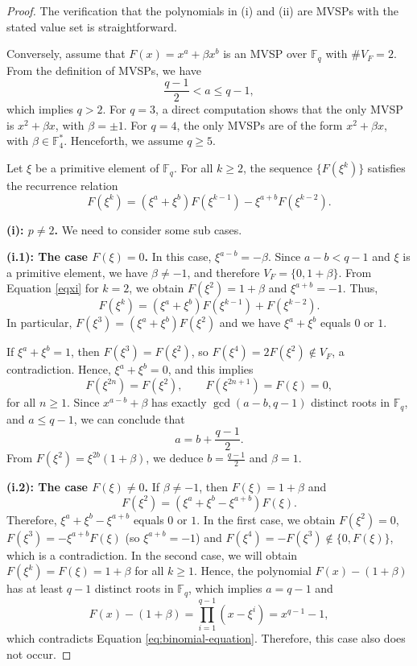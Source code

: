\documentclass[preprint,12pt]{elsarticle}
\begin{document}
\begin{proof}
The verification that the polynomials in {\rm (i)} and {\rm (ii)} are MVSPs with the stated value set is straightforward.

Conversely, assume that $F(x) = x^a + \beta x^b$ is an MVSP over $\mathbb{F}_q$ with $\#V_F = 2$. From the definition of MVSPs, we have
\[
\frac{q-1}{2} < a \leq q-1,
\]
which implies $q > 2$. For $q = 3$, a direct computation shows that the only MVSP is $x^2 + \beta x$, with $\beta = \pm 1$.
For $q = 4$, the only MVSPs are of the form $x^2 + \beta x$, with $\beta \in \mathbb{F}_4^*$. Henceforth, we assume $q \ge 5$.

Let $\xi$ be a primitive element of $\mathbb{F}_q$. For all $k \ge 2$, the sequence $\{F(\xi^k)\}$ satisfies the recurrence relation
\begin{equation}\label{eqxi}
F(\xi^k) = (\xi^a + \xi^b)F(\xi^{k-1}) - \xi^{a+b}F(\xi^{k-2}).
\end{equation}

\medskip

\noindent
\textbf{(i): $p \neq 2$.} We need to consider some sub cases.

\noindent
\textbf{(i.1): The case $F(\xi) = 0$.}
In this case, $\xi^{a-b} = -\beta$. Since $a-b < q-1$ and $\xi$ is a primitive element, we have $\beta \neq -1$, and therefore $V_F = \{0, 1+\beta\}$. From Equation \eqref{eqxi} for $k=2$, we obtain $F(\xi^2)=1+\beta$ and $\xi^{a+b}=-1$. Thus,
\[
F(\xi^k) = (\xi^a+\xi^b)F(\xi^{k-1}) + F(\xi^{k-2}).
\]
In particular, $F(\xi^3) = (\xi^a + \xi^b)F(\xi^2)$ and we have $\xi^a + \xi^b$ equals $0$ or $1$.

If $\xi^a+\xi^b = 1$, then $F(\xi^3) = F(\xi^2)$, so $F(\xi^4)=2F(\xi^2)\notin V_F$, a contradiction. Hence, $\xi^a+\xi^b=0$, and this implies
\[
F(\xi^{2n}) = F(\xi^2), \qquad F(\xi^{2n+1}) = F(\xi) = 0,
\]
for all $n \ge 1$. Since \( x^{a - b} + \beta \) has exactly \( \gcd(a - b, q - 1) \) distinct roots in \( \mathbb{F}_q \), and \( a \leq q - 1 \), we can conclude that
$$
a = b + \frac{q - 1}{2}.
$$
From $F(\xi^2)=\xi^{2b}(1+\beta)$, we deduce $b = \frac{q-1}{2}$ and $\beta = 1$.

\smallskip

\noindent
\textbf{(i.2): The case $F(\xi) \neq 0$.}
If $\beta \neq -1$, then $F(\xi)=1+\beta$ and
\[
F(\xi^2) = (\xi^a+\xi^b-\xi^{a+b})F(\xi).
\]
Therefore, $\xi^a+\xi^b-\xi^{a+b}$ equals $0$ or $1$. In the first case, we obtain $F(\xi^2) = 0$, $F(\xi^3) = -\xi^{a + b} F(\xi)$ (so $\xi^{a + b} = -1$) and $F(\xi^4) = -F(\xi^3) \notin \{0, F(\xi)\}$, which is a contradiction. In the second case, we will obtain $F(\xi^k) = F(\xi) = 1 + \beta$ for all $k \geq 1$. Hence, the polynomial $F(x) - (1 + \beta)$ has at least $q - 1$ distinct roots in $\mathbb{F}_q$, which implies $a = q - 1$ and
  $$
  F(x) - (1 + \beta) = \prod_{i = 1}^{q - 1}(x - \xi^i) = x^{q - 1} - 1,
  $$
  which contradicts Equation \eqref{eq:binomial-equation}. Therefore, this case also does not occur. 
  

\end{proof}
\end{document}
